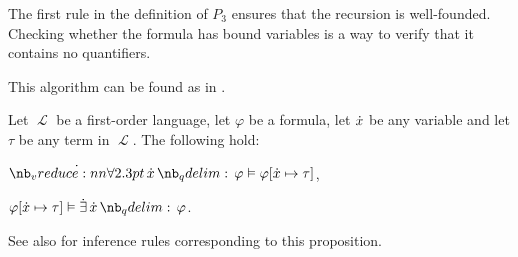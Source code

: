 \begin{comments}
  \item The first rule in the definition of \( P_3 \) ensures that the recursion is well-founded. Checking whether the formula has bound variables is a way to verify that it contains no quantifiers.
  \item This algorithm can be found as  in \cite{code}.
\end{comments}

\begin{proposition}\label{thm:quantifier_satisfiability}
  Let \( \mscrL \) be a first-order language, let \( \varphi \) be a formula, let \( {\dot{x}} \) be any variable and let \( \tau \) be any term in \( \mscrL \). The following hold:

  \begin{thmenum}
     \( \qforall \synx \varphi \vDash \varphi[\synx \mapsto \tau] \),

     \( \varphi[\synx \mapsto \tau] \vDash \qexists \synx \varphi \).
  \end{thmenum}
\end{proposition}
\begin{comments}
  \item See also  for inference rules corresponding to this proposition.
\end{comments}
